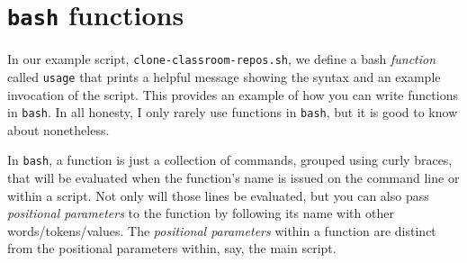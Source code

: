 \documentclass[]{krantz}
\makeatletter
\newenvironment{Shaded}{\begin{snugshade}}{\end{snugshade}}
\newcommand{\BuiltInTok}[1]{#1}
\newcommand{\CommentTok}[1]{\textcolor[rgb]{0.37,0.37,0.37}{\textit{#1}}}
\newcommand{\ExtensionTok}[1]{#1}
\newcommand{\FunctionTok}[1]{\textcolor[rgb]{0,0,0}{#1}}
\newcommand{\KeywordTok}[1]{\textcolor[rgb]{0.27,0.27,0.27}{\textbf{#1}}}
\newcommand{\NormalTok}[1]{#1}
\newcommand{\StringTok}[1]{\textcolor[rgb]{0.5,0.5,0.5}{#1}}
\newcommand{\VariableTok}[1]{\textcolor[rgb]{0,0,0}{#1}}
\newenvironment{kframe}{%
\medskip{}
\setlength{\fboxsep}{.8em}
 \def\at@end@of@kframe{}%
 \ifinner\ifhmode%
  \def\at@end@of@kframe{\end{minipage}}%
  \begin{minipage}{\columnwidth}%
 \fi\fi%
 \def\FrameCommand##1{\hskip\@totalleftmargin \hskip-\fboxsep
 \colorbox{shadecolor}{##1}\hskip-\fboxsep
     \hskip-\linewidth \hskip-\@totalleftmargin \hskip\columnwidth}%
 \MakeFramed {\advance\hsize-\width
   \@totalleftmargin\z@ \linewidth\hsize
   \@setminipage}}%
 {\par\unskip\endMakeFramed%
 \at@end@of@kframe}
\renewenvironment{Shaded}{\begin{kframe}}{\end{kframe}}
\makeatother
\begin{document}
\begin{Shaded}
\end{Shaded}

\hypertarget{bash-functions}{%
\section{\texorpdfstring{\texttt{bash} functions}{bash functions}}\label{bash-functions}}

In our example script, \texttt{clone-classroom-repos.sh}, we define a bash \emph{function} called \texttt{usage}
that prints a helpful message showing the syntax and an example invocation of the script.
This provides an example of how you can write functions in \texttt{bash}. In all honesty, I only
rarely use functions in \texttt{bash}, but it is good to know about nonetheless.

In \texttt{bash}, a function is just a collection of commands, grouped using curly braces, that
will be evaluated when the function's name is issued on the command line or within a script.
Not only will those lines be evaluated, but you can also pass \emph{positional parameters} to the
function by following its name with other words/tokens/values. The \emph{positional parameters}
within a function are distinct from the positional parameters within, say, the main script.
\end{document}

